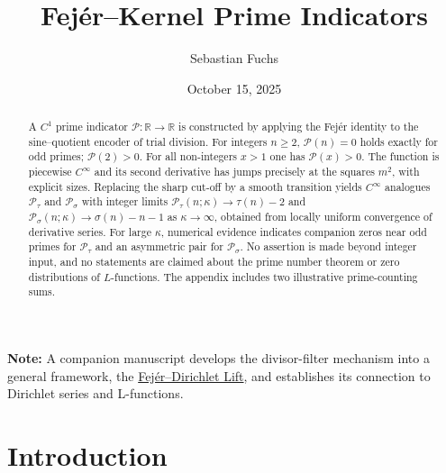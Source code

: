 \documentclass[11pt,a4paper]{amsart}
\title[Fej\'er--Kernel Prime Indicators]{Fej\'er--Kernel Prime Indicators}
\author{Sebastian Fuchs \orcidlink{0009-0009-1237-4804}}
\date{October 15, 2025}
\theoremstyle{plain}
\theoremstyle{definition}
\theoremstyle{remark}
\begin{document}
\maketitle

\begingroup\small
\noindent\textbf{Note:} A companion manuscript develops the divisor-filter mechanism into a general framework, the \href{https://arxiv.org/abs/2509.12297}{Fej\'er--Dirichlet Lift}, and establishes its connection to Dirichlet series and L-functions.
\par\medskip
\endgroup

\begin{abstract}
A $C^1$ prime indicator $\mathcal{P}\colon\mathbb{R}\to\mathbb{R}$ is constructed by applying the Fejér identity to the sine–quotient encoder of trial division. For integers $n\ge 2$, $\mathcal P(n)=0$ holds exactly for odd primes; $\mathcal P(2)>0$. For all non-integers $x>1$ one has $\mathcal P(x)>0$. The function is piecewise $C^\infty$ and its second derivative has jumps precisely at the squares $m^2$, with explicit sizes. Replacing the sharp cut-off by a smooth transition yields $C^\infty$ analogues $\mathcal{P}_\tau$ and $\mathcal{P}_\sigma$ with integer limits $\mathcal{P}_\tau(n;\kappa)\to \tau(n)-2$ and $\mathcal{P}_\sigma(n;\kappa)\to \sigma(n)-n-1$ as $\kappa\to\infty$, obtained from locally uniform convergence of derivative series. For large $\kappa$, numerical evidence indicates companion zeros near odd primes for $\mathcal{P}_\tau$ and an asymmetric pair for $\mathcal{P}_\sigma$. No assertion is made beyond integer input, and no statements are claimed about the prime number theorem or zero distributions of $L$-functions. The appendix includes two illustrative prime-counting sums.
\end{abstract}

\clearpage
\begingroup
\hypersetup{linkcolor=black} %
\tableofcontents
\endgroup
\hypersetup{linkcolor=blue}
\bigskip
\clearpage

\section{Introduction}
\end{document}
